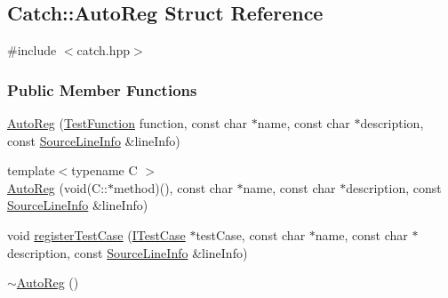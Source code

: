 \hypertarget{structCatch_1_1AutoReg}{\subsection{Catch\-:\-:Auto\-Reg Struct Reference}
\label{structCatch_1_1AutoReg}
}


{\ttfamily \#include $<$catch.\-hpp$>$}

\subsubsection*{Public Member Functions}
\begin{DoxyCompactItemize}
\item 
\hyperlink{structCatch_1_1AutoReg_a08074c82a7bda1fdbbe80e85e10f4c59}{Auto\-Reg} (\hyperlink{namespaceCatch_a768da872b9033e4c71c6f316393d35db}{Test\-Function} function, const char $\ast$name, const char $\ast$description, const \hyperlink{structCatch_1_1SourceLineInfo}{Source\-Line\-Info} \&line\-Info)
\item 
{\footnotesize template$<$typename C $>$ }\\\hyperlink{structCatch_1_1AutoReg_a731f720d0b63c323f6e8f4f82fbdd22b}{Auto\-Reg} (void(C\-::$\ast$method)(), const char $\ast$name, const char $\ast$description, const \hyperlink{structCatch_1_1SourceLineInfo}{Source\-Line\-Info} \&line\-Info)
\item 
void \hyperlink{structCatch_1_1AutoReg_ac4123f648f75d462a4e68ad291799cf2}{register\-Test\-Case} (\hyperlink{structCatch_1_1ITestCase}{I\-Test\-Case} $\ast$test\-Case, const char $\ast$name, const char $\ast$description, const \hyperlink{structCatch_1_1SourceLineInfo}{Source\-Line\-Info} \&line\-Info)
\item 
\hyperlink{structCatch_1_1AutoReg_a3cdb53f1e5ff115310f3372bebe198f1}{$\sim$\-Auto\-Reg} ()
\end{DoxyCompactItemize}


